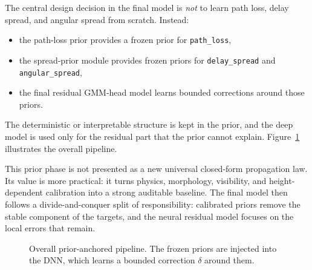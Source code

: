 The central design decision in the final model is \emph{not} to learn path
loss, delay spread, and angular spread from scratch. Instead:

\begin{itemize}
\item the path-loss prior provides a frozen prior for \texttt{path\_loss},
\item the spread-prior module provides frozen priors for \texttt{delay\_spread} and
      \texttt{angular\_spread},
\item the final residual GMM-head model learns bounded corrections around those priors.
\end{itemize}

The deterministic or interpretable structure is kept in the prior, and the deep
model is used only for the residual part that the prior cannot explain.
Figure~\ref{fig:pipeline} illustrates the overall pipeline.

This prior phase is not presented as a new universal closed-form propagation
law. Its value is more practical: it turns physics, morphology, visibility, and
height-dependent calibration into a strong auditable baseline. The final model
then follows a divide-and-conquer split of responsibility: calibrated priors
remove the stable component of the targets, and the neural residual model
focuses on the local errors that remain.

\begin{figure}[H]
\centering
{}
\caption[Overall prior-anchored pipeline with bounded DNN corrections.]
{Overall prior-anchored pipeline. The frozen priors are injected into the DNN, which learns a bounded correction $\delta$ around them.}
\label{fig:pipeline}
\end{figure}

